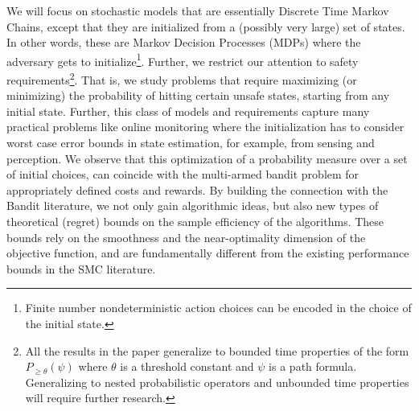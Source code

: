 \documentclass[11pt]{article}
\theoremstyle{definition}
\newcommand{\sayan}[1]{\textcolor{blue}{#1}}
\newcommand{\modelname}{NiMC\xspace}
\begin{document}
We will focus on stochastic models that are essentially Discrete Time Markov Chains, except that they are initialized from a (possibly very large) set of states.
%
%
In other words, these are Markov Decision Processes (MDPs) where the adversary gets to initialize\footnote{
Finite number nondeterministic action choices can  be encoded in the choice of the initial state.}.
%
Further, we restrict our attention to  safety requirements\footnote{All the results in the paper  generalize to bounded time properties of the form $P_{\geq \theta}(\psi)$ where $\theta$ is a threshold constant and $\psi$ is a path formula. Generalizing to nested probabilistic operators and unbounded time properties will require further research.}. That is, we study problems that require maximizing (or minimizing) the probability of hitting  certain  unsafe states, starting from any initial state.
%
%
Further, this class of models and requirements capture many practical problems like online monitoring where the initialization has to consider  worst case error bounds in state estimation, for example, from sensing and perception.
We observe  that this optimization of a probability measure over a set of initial choices, can coincide with the multi-armed bandit problem for appropriately defined costs and rewards.
%
By building the connection with the Bandit literature, we not only gain algorithmic ideas, but also new types of theoretical (regret) bounds on the sample efficiency of the algorithms. These bounds rely  on the smoothness and the near-optimality dimension of the objective function, and are fundamentally different from the existing performance bounds in the SMC literature.
%


%
\end{document}

